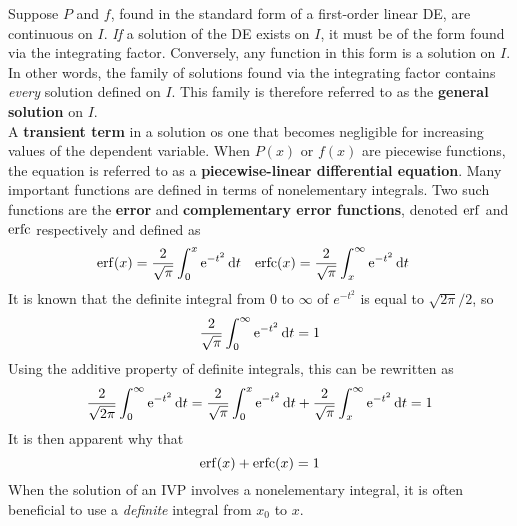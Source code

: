 \documentclass[./Differential Equations.tex]{subfiles}
\begin{document}
			Suppose \(P\) and \(f\), found in the standard form of a first-order linear DE, are continuous on \(I\). \textit{If} a solution of the DE exists on \(I\), it must be of the form found via the integrating factor. Conversely, any function in this form is a solution on \(I\). In other words, the family of solutions found via the integrating factor contains \textit{every} solution defined on \(I\). This family is therefore referred to as the \textbf{general solution} on \(I\). \\
			A \textbf{transient term} in a solution os one that becomes negligible for increasing values of the dependent variable.
			When \(P(x)\) or \(f(x)\) are piecewise functions, the equation is referred to as a \textbf{piecewise-linear differential equation}.
			Many important functions are defined in terms of nonelementary integrals. Two such functions are the \textbf{error} and \textbf{complementary error functions}, denoted \(\erf\) and \(\operatorname{erfc}\) respectively and defined as
				\begin{align*}
					\erf(x) &= \frac{2}{\sqrt{\pi}}\int_0^x \en^{-t^2}\dd{t} &
							\erfc(x) &= \frac{2}{\sqrt{\pi}}\int_x^\infty \en^{-t^2}\dd{t}
				\end{align*}
			It is known that the definite integral from 0 to \(\infty\) of \(e^{-t^2}\) is equal to \(\sqrt{2\pi}/2\), so
				\[\frac{2}{\sqrt{\pi}}\int_0^\infty \operatorname{e}^{-t^2}\dd{t} = 1\]
				Using the additive property of definite integrals, this can be rewritten as
				\[
					\frac{2}{\sqrt{2\pi}}\int_0^\infty \operatorname{e}^{-t^2}\dd{t}
							= \frac{2}{\sqrt{\pi}}\int_0^x \operatorname{e}^{-t^2}\dd{t} + \frac{2}{\sqrt{\pi}}\int_x^\infty \operatorname{e}^{-t^2}\dd{t}
							= 1
				\]
				It is then apparent why that
				\[\erf(x) + \erfc(x) = 1\]
			When the solution of an IVP involves a nonelementary integral, it is often beneficial to use a \textit{definite} integral from \(x_0\) to \(x\).
\end{document}
